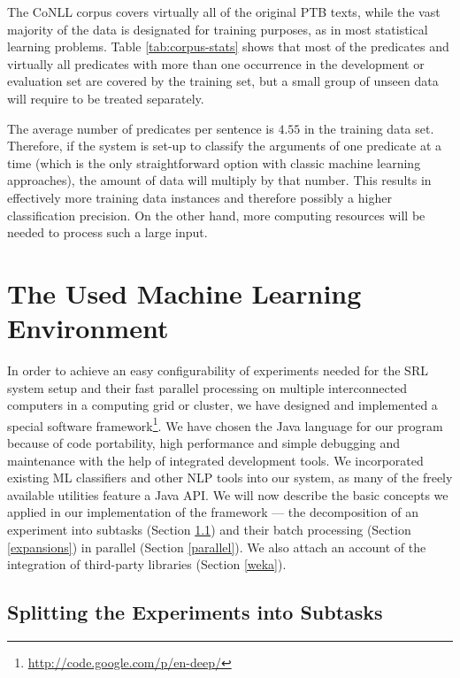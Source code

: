\documentclass[12pt,notitlepage]{report}
\begin{document}
The CoNLL corpus covers virtually all of the original PTB texts, while the vast majority of the data is designated for training purposes, as in most statistical learning problems. Table \ref{tab:corpus-stats} shows that most of the predicates and virtually all predicates with more than one occurrence in the development or evaluation set are covered by the training set, but a small group of unseen data will require to be treated separately. 

The average number of predicates per sentence is $4.55$ in the training data set. Therefore, if the system is set-up to classify the arguments of one predicate at a time (which is the only straightforward option with classic machine learning approaches), the amount of data will multiply by that number. This results in effectively more training data instances and therefore possibly a higher classification precision. On the other hand, more computing resources will be needed to process such a large input.

%
%
\chapter{The Used Machine Learning Environment}\label{mlprocess}
%
%

In order to achieve an easy configurability of experiments needed for the SRL system setup and their fast parallel processing on multiple interconnected computers in a computing grid or cluster, we have designed and implemented a special software framework\footnote{\url{http://code.google.com/p/en-deep/}}. We have chosen the Java language for our program because of code portability, high performance and simple debugging and maintenance with the help of integrated development tools. We incorporated existing ML classifiers and other NLP tools into our system, as many of the freely available utilities feature a Java API. We will now describe the basic concepts we applied in our implementation of the framework --- the decomposition of an experiment into subtasks (Section \ref{tasks}) and their batch processing (Section \ref{expansions}) in parallel (Section \ref{parallel}). We also attach an account of the integration of third-party libraries (Section \ref{weka}).

\section{Splitting the Experiments into Subtasks}\label{tasks}
\end{document}
